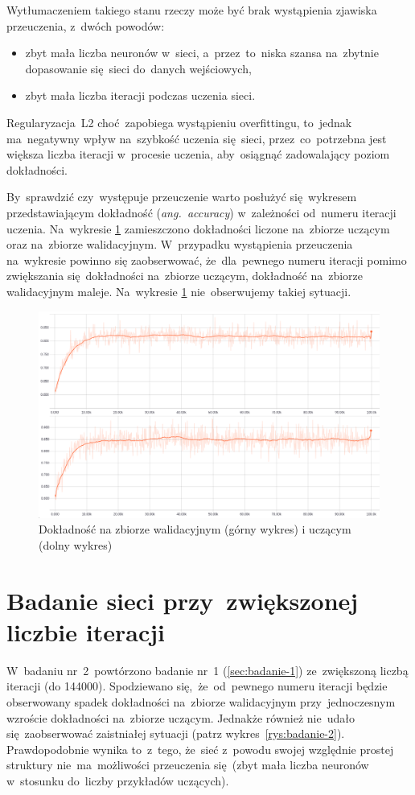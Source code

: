 Wytłumaczeniem takiego stanu rzeczy może być brak wystąpienia zjawiska przeuczenia, z~dwóch powodów:
\begin{itemize}
    \item zbyt mała liczba neuronów w~sieci, a~przez~to~niska szansa na~zbytnie dopasowanie się~sieci do~danych
          wejściowych,
    \item zbyt mała liczba iteracji podczas uczenia sieci.
\end{itemize}
Regularyzacja~L2 choć~zapobiega wystąpieniu overfittingu, to~jednak ma~negatywny wpływ na~szybkość uczenia się~sieci,
przez~co~potrzebna jest większa liczba iteracji w~procesie uczenia, aby~osiągnąć zadowalający poziom dokładności.

By~sprawdzić czy~występuje przeuczenie warto posłużyć się~wykresem przedstawiającym dokładność (\textit{ang.~accuracy})
w~zależności od~numeru iteracji uczenia. Na~wykresie \ref{rys:badanie-1} zamieszczono
dokładności liczone na~zbiorze uczącym oraz na~zbiorze walidacyjnym. W~przypadku wystąpienia przeuczenia na~wykresie
powinno się zaobserwować, że~dla~pewnego numeru iteracji pomimo zwiększania się~dokładności na~zbiorze uczącym,
dokładność na~zbiorze walidacyjnym maleje. Na~wykresie \ref{rys:badanie-1} nie~obserwujemy takiej sytuacji.

\begin{figure}[H]
	\centering
	\includegraphics[width=\linewidth]{img/badanie_1.png}
	\caption{Dokładność na zbiorze walidacyjnym (górny wykres) i uczącym (dolny wykres)}
	\label{rys:badanie-1}
\end{figure}

\section{Badanie sieci przy~zwiększonej liczbie iteracji}
W~badaniu nr~2~powtórzono badanie nr~1 (\ref{sec:badanie-1}) ze~zwiększoną liczbą iteracji (do 144000).
Spodziewano się,~że~od~pewnego numeru iteracji będzie obserwowany spadek dokładności na~zbiorze walidacyjnym
przy~jednoczesnym wzroście dokładności na~zbiorze uczącym. Jednakże również nie~udało się~zaobserwować zaistniałej
sytuacji (patrz wykres~\ref{rys:badanie-2}). Prawdopodobnie wynika to~z~tego, że~sieć z~powodu swojej względnie prostej
struktury nie~ma~możliwości przeuczenia się~(zbyt mała liczba neuronów w~stosunku do~liczby przykładów uczących).

